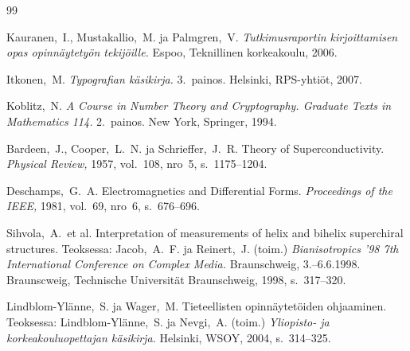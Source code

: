 \documentclass[english,12pt,a4paper,pdftex,elec,utf8]{aaltothesis}
\begin{document}
{}
\begin{thebibliography}{99}

 Kauranen,\ I., Mustakallio,\ M. ja Palmgren,\ V.
  \textit{Tutkimusraportin kirjoittamisen opas opinn\"aytety\"on
    tekij\"oille.}  Espoo, Teknillinen korkeakoulu, 2006.

 Itkonen,\ M. \textit{Typografian k\"asikirja.} 3.\
  painos.  Helsinki, RPS-yhti\"ot, 2007.

 Koblitz,\ N. \textit{A Course in Number Theory and
    Cryptography. Graduate Texts in Mathematics 114.}  2.\ painos. New
  York, Springer, 1994.

\bibitem{bcs} Bardeen,\ J., Cooper,\ L.\ N. ja Schrieffer,\ J.\ R.
  Theory of Superconductivity. \textit{Physical Review,} 1957, vol.\
  108, nro~5, s.\ 1175--1204.

 Deschamps,\ G.\ A. Electromagnetics and
  Differential Forms. \textit{Proceedings of the IEEE,} 1981, vol.\
  69, nro~6, s.\ 676--696.

\bibitem{Sihvola} Sihvola,\ A.\ et al.
  Interpretation of measurements of helix 
    and bihelix superchiral structures.
  Teoksessa: Jacob,\ A.\ F. ja
  Reinert,\ J. (toim.) \textit{Bianisotropics '98 7th International
    Conference on Complex Media.}  Braunschweig, 3.--6.6.1998.
  Braunscweig, Technische Universit\"at Braunschweig, 1998, s.\
  317--320.

 Lindblom-Yl\"anne,\ S. ja Wager,\ M.  Tieteellisten
  opinn\"aytet\"oiden ohjaaminen. Teoksessa: Lindblom-Yl\"anne,\ S. ja
  Nevgi,\ A. (toim.) \textit{Yliopisto- ja korkeakouluopettajan
    k\"asikirja.}  Helsinki, WSOY, 2004, s.\ 314--325.
 

\end{thebibliography}
\end{document}
